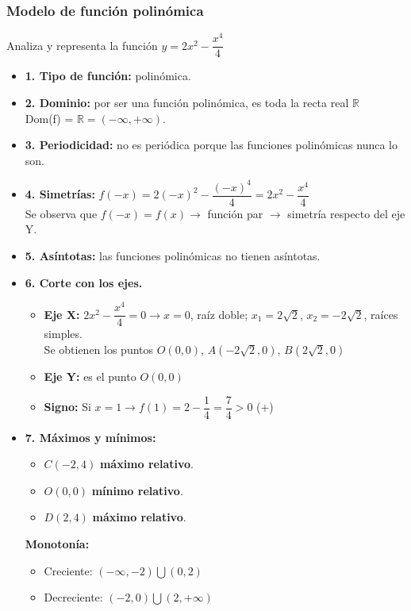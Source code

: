\subsubsection{Modelo de función polinómica}
Analiza y representa la función $y = 2x^2 - \dfrac{x^4}{4}$
\begin{itemize}
	\item \textbf{1. Tipo de función: }polinómica.
	\item \textbf{2. Dominio: }por ser una función polinómica, es toda la recta real $\mathbb{R}$ \\
	Dom(f) = $\mathbb{R} = (-\infty, +\infty)$.
	\item \textbf{3. Periodicidad: }no es periódica porque las funciones polinómicas nunca lo son.
	\item \textbf{4. Simetrías: }$f(-x)=2(-x)^2-\dfrac{(-x)^4}{4}=2x^2-\dfrac{x^4}{4}$\\ Se observa que $f(-x)=f(x) \rightarrow$ función par $\rightarrow$ simetría respecto del eje Y.
	\item \textbf{5. Asíntotas: }las funciones polinómicas no tienen asíntotas.
	\item \textbf{6. Corte con los ejes.}
	\begin{itemize}
	\item \textbf{Eje X: }$2x^2-\dfrac{x^4}{4}=0 \rightarrow x=0$, raíz doble; $x_1=2\sqrt{2}$, $x_2=-2\sqrt{2}$, raíces simples.\\
	Se obtienen los puntos $O(0,0)$, $A(-2\sqrt{2},0)$, $B(2\sqrt{2},0)$
	\item \textbf{Eje Y: }es el punto $O(0,0)$
	\item \textbf{Signo: }Si $x=1 \rightarrow f(1)=2-\dfrac{1}{4}=\dfrac{7}{4}>0$ (+)
	\end{itemize}
	\item \textbf{7. Máximos y mínimos:}\\
	\begin{itemize}
		\item $C(-2,4)$ \textbf{máximo relativo}.\\
		\item $O(0,0)$ \textbf{mínimo relativo}.\\
		\item $D(2,4)$ \textbf{máximo relativo}.\\
	\end{itemize}
	\textbf{Monotonía:}\\
	\begin{itemize}
		\item Creciente: $(-\infty, -2) \bigcup (0, 2)$
		\item Decreciente: $(-2, 0) \bigcup (2, +\infty)$
	\end{itemize}
	

\end{itemize}
